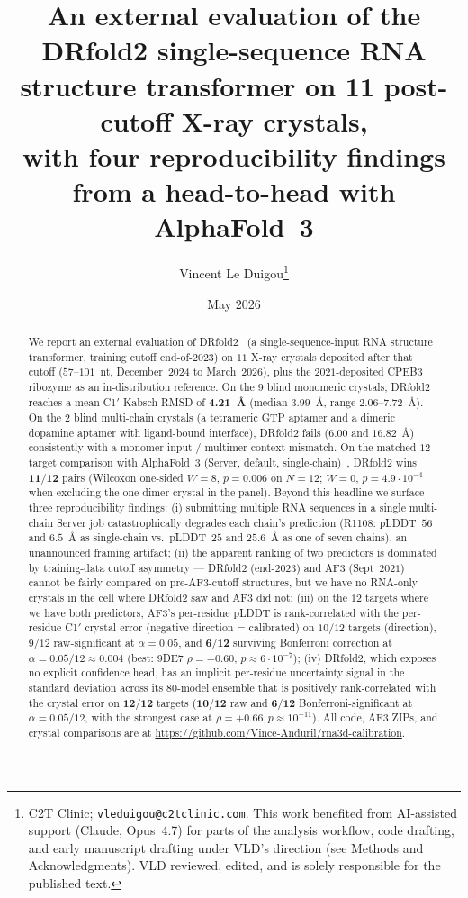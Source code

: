 \documentclass[11pt,a4paper]{article}
\title{\textbf{An external evaluation of the DRfold2 single-sequence RNA\\
structure transformer on 11 post-cutoff X-ray crystals,\\
with four reproducibility findings from a head-to-head with AlphaFold~3}}
\author{Vincent Le Duigou\thanks{C2T Clinic; \texttt{vleduigou@c2tclinic.com}. This work benefited from AI-assisted support (Claude, Opus~4.7) for parts of the analysis workflow, code drafting, and early manuscript drafting under VLD's direction (see Methods and Acknowledgments). VLD reviewed, edited, and is solely responsible for the published text.}}
\date{May 2026}
\begin{document}
\maketitle

\begin{abstract}
We report an external evaluation of DRfold2~\cite{drfold2_2025} (a
single-sequence-input RNA structure transformer, training cutoff
end-of-2023) on $11$ X-ray crystals deposited after that cutoff
($57$--$101$~nt, December~2024 to March~2026), plus the
$2021$-deposited CPEB3 ribozyme as an in-distribution reference. On
the $9$ blind monomeric crystals, DRfold2 reaches a mean C1$'$ Kabsch
RMSD of \textbf{4.21~\AA{}} (median $3.99$~\AA{}, range $2.06$--$7.72$~\AA{}).
On the $2$ blind multi-chain crystals (a tetrameric GTP aptamer and a
dimeric dopamine aptamer with ligand-bound interface), DRfold2 fails
($6.00$ and $16.82$~\AA{}) consistently with a monomer-input /
multimer-context mismatch. On the matched $12$-target comparison with AlphaFold~3
(Server, default, single-chain)~\cite{af3_2024}, DRfold2 wins
$\mathbf{11/12}$ pairs (Wilcoxon one-sided
$W=8$, $p=0.006$ on $N=12$; $W=0$, $p=4.9\!\cdot\!10^{-4}$ when
excluding the one dimer crystal in the panel). Beyond this
headline we surface three reproducibility findings:
(i) submitting multiple RNA sequences in a single multi-chain
Server job catastrophically degrades each chain's prediction
(R1108: pLDDT~$56$ and $6.5$~\AA{} as single-chain vs.~pLDDT~$25$ and
$25.6$~\AA{} as one of seven chains), an unannounced framing artifact;
(ii) the apparent ranking of two predictors is dominated by training-data
cutoff asymmetry --- DRfold2 (end-$2023$) and AF3 (Sept~$2021$) cannot
be fairly compared on pre-AF3-cutoff structures, but we have no
RNA-only crystals in the cell where DRfold2 saw and AF3 did not;
(iii) on the $12$ targets where we have both predictors, AF3's
per-residue pLDDT is rank-correlated with the per-residue C1$'$
crystal error (negative direction = calibrated) on $10/12$ targets
(direction), $9/12$ raw-significant at $\alpha=0.05$, and
$\mathbf{6/12}$ surviving Bonferroni correction at
$\alpha=0.05/12 \approx 0.004$ (best: 9DE7 $\rho=-0.60$, $p\!\approx\!6\!\cdot\!10^{-7}$); (iv) DRfold2,
which exposes no explicit confidence head, has an implicit
per-residue uncertainty signal in the standard deviation across its
$80$-model ensemble that is positively rank-correlated with the
crystal error on $\mathbf{12/12}$ targets ($\mathbf{10/12}$ raw and
$\mathbf{6/12}$ Bonferroni-significant at $\alpha=0.05/12$, with the
strongest case at $\rho=+0.66, p\approx 10^{-11}$). All code, AF3
ZIPs, and crystal comparisons are at
\url{https://github.com/Vince-Anduril/rna3d-calibration}.
\end{abstract}
\end{document}
